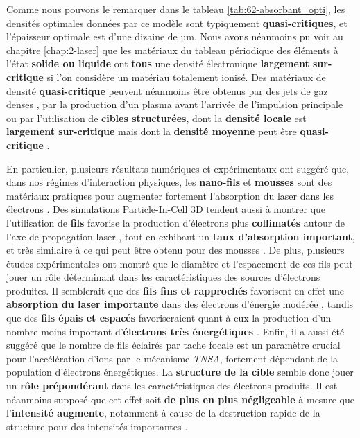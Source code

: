 \begin{refsection}
Comme nous pouvons le remarquer dans le tableau \ref{tab:62-absorbant_opti}, les densités optimales données par ce modèle sont typiquement \textbf{quasi-critiques}, et l'épaisseur optimale est d'une dizaine de µm. Nous avons néanmoins pu voir au chapitre \ref{chap:2-laser} que les matériaux du tableau périodique des éléments à l'état \textbf{solide ou liquide} ont \textbf{tous} une densité électronique \textbf{largement sur-critique} si l'on considère un matériau totalement ionisé. 
Des matériaux de densité \textbf{quasi-critique} peuvent néanmoins être obtenus par des jets de gaz denses \parencite{sylla_2012, prencipe_2017}, par la production d'un plasma avant l'arrivée de l'impulsion principale \parencite{prencipe_2017, compantlafontaine_2019} ou par l'utilisation de \textbf{cibles structurées}, dont la \textbf{densité locale} est \textbf{largement sur-critique} mais dont la \textbf{densité moyenne} peut être \textbf{quasi-critique} \parencite{prencipe_2017, fedeli_2018c, gheorghiu_2016}.

En particulier, plusieurs résultats numériques et expérimentaux ont suggéré que, dans nos régimes d'interaction physiques, les \textbf{nano-fils} et \textbf{mousses} sont des matériaux pratiques pour augmenter fortement l'absorption du laser dans les électrons \parencite{fedeli_2018c, cristoforetti_2017, dozieres_2019}. Des simulations Particle-In-Cell 3D tendent aussi à montrer que l'utilisation de \textbf{fils} favorise la production d'électrons plus \textbf{collimatés} autour de l'axe de propagation laser \parencite{fedeli_2018c, jiang_2014}, tout en exhibant un \textbf{taux d'absorption important}, et très similaire à ce qui peut être obtenu pour des mousses \parencite{fedeli_2018c}. De plus, plusieurs études expérimentales \parencite{cristoforetti_2017, dozieres_2019} ont montré que le diamètre et l'espacement de ces fils peut jouer un rôle déterminant dans les caractéristiques des sources d'électrons produites. Il semblerait que des \textbf{fils fins et rapprochés} favorisent en effet une \textbf{absorption du laser importante} dans des électrons d'énergie modérée \parencite{cristoforetti_2017, fedeli_2018c}, tandis que des \textbf{fils épais et espacés} favoriseraient quant à eux la production d'un nombre moins important d'\textbf{électrons très énergétiques} \parencite{cristoforetti_2017, jiang_2014}. Enfin, il a aussi été suggéré \parencite{dozieres_2019} que le nombre de fils éclairés par tache focale est un paramètre crucial pour l'accélération d'ions par le mécanisme \textit{TNSA}, fortement dépendant de la population d'électrons énergétiques. La \textbf{structure de la cible} semble donc jouer un \textbf{rôle prépondérant} dans les caractéristiques des électrons produits. Il est néanmoins supposé que cet effet soit \textbf{de plus en plus négligeable} à mesure que l'\textbf{intensité augmente}, notamment à cause de la destruction rapide de la structure pour des intensités importantes \parencite{fedeli_2018c}. 


\end{refsection}
